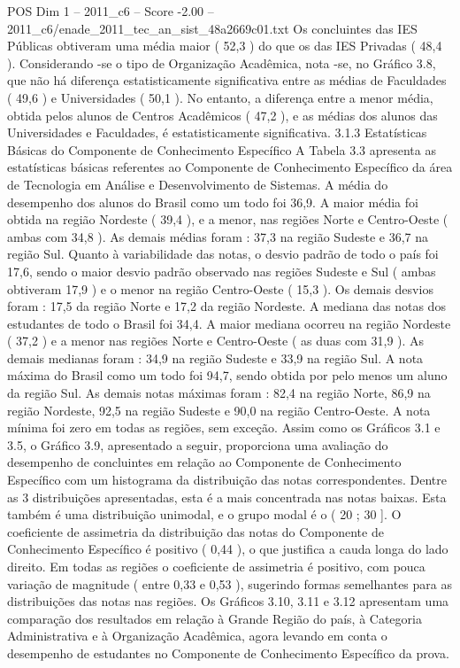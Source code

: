 \begin{textsample}{POS Dim 1 – 2011\_c6 – Score -2.00 – 2011\_c6/enade\_2011\_tec\_an\_sist\_48a2669c01.txt}
Os concluintes das IES Públicas obtiveram uma média maior ( 52,3 ) do que os das IES Privadas ( 48,4 ).
Considerando -se o tipo de Organização Acadêmica, nota -se, no Gráfico 3.8, que não há diferença estatisticamente significativa entre as médias de Faculdades ( 49,6 ) e Universidades ( 50,1 ).
No entanto, a diferença entre a menor média, obtida pelos alunos de Centros Acadêmicos ( 47,2 ), e as médias dos alunos das Universidades e Faculdades, é estatisticamente significativa. 3.1.3 Estatísticas Básicas do Componente de Conhecimento Específico A Tabela 3.3 apresenta as estatísticas básicas referentes ao Componente de Conhecimento Específico da área de Tecnologia em Análise e Desenvolvimento de Sistemas.
A média do desempenho dos alunos do Brasil como um todo foi 36,9.
A maior média foi obtida na região Nordeste ( 39,4 ), e a menor, nas regiões Norte e Centro-Oeste ( ambas com 34,8 ).
As demais médias foram : 37,3 na região Sudeste e 36,7 na região Sul.
Quanto à variabilidade das notas, o desvio padrão de todo o país foi 17,6, sendo o maior desvio padrão observado nas regiões Sudeste e Sul ( ambas obtiveram 17,9 ) e o menor na região Centro-Oeste ( 15,3 ).
Os demais desvios foram : 17,5 da região Norte e 17,2 da região Nordeste.
A mediana das notas dos estudantes de todo o Brasil foi 34,4.
A maior mediana ocorreu na região Nordeste ( 37,2 ) e a menor nas regiões Norte e Centro-Oeste ( as duas com 31,9 ).
As demais medianas foram : 34,9 na região Sudeste e 33,9 na região Sul.
A nota máxima do Brasil como um todo foi 94,7, sendo obtida por pelo menos um aluno da região Sul.
As demais notas máximas foram : 82,4 na região Norte, 86,9 na região Nordeste, 92,5 na região Sudeste e 90,0 na região Centro-Oeste.
A nota mínima foi zero em todas as regiões, sem exceção.
Assim como os Gráficos 3.1 e 3.5, o Gráfico 3.9, apresentado a seguir, proporciona uma avaliação do desempenho de concluintes em relação ao Componente de Conhecimento Específico com um histograma da distribuição das notas correspondentes.
Dentre as 3 distribuições apresentadas, esta é a mais concentrada nas notas baixas.
Esta também é uma distribuição unimodal, e o grupo modal é o ( 20 ; 30 ].
O coeficiente de assimetria da distribuição das notas do Componente de Conhecimento Específico é positivo ( 0,44 ), o que justifica a cauda longa do lado direito.
Em todas as regiões o coeficiente de assimetria é positivo, com pouca variação de magnitude ( entre 0,33 e 0,53 ), sugerindo formas semelhantes para as distribuições das notas nas regiões.
Os Gráficos 3.10, 3.11 e 3.12 apresentam uma comparação dos resultados em relação à Grande Região do país, à Categoria Administrativa e à Organização Acadêmica, agora levando em conta o desempenho de estudantes no Componente de Conhecimento Específico da prova.

\end{textsample}
